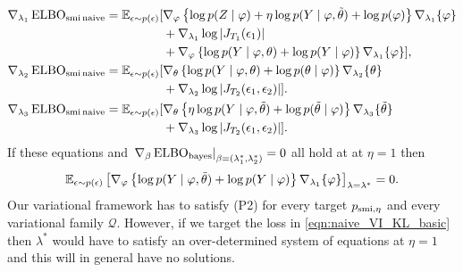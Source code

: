 \begin{align}
  \nabla_{\lambda_1} \operatorname{\text{ELBO}}_{\operatorname{\text{smi}} \text{naive}} = \operatorname{\mathbb{E}}_{\epsilon \sim p(\epsilon)}[ & \nabla_{\varphi} \left\{ \log p(Z \mid \varphi) + \eta \log p(Y \mid \varphi, \tilde\theta) + \log p(\varphi) \right\} \nabla_{\lambda_1} \{ \varphi \} \nonumber                         \\
                                                                                 & + \nabla_{\lambda_1} \log \left\vert J_{T_1}(\epsilon_1) \right\vert \nonumber                                                                                                            \\
                                                                                 & + \nabla_{\varphi} \left\{ \log p(Y \mid \varphi, \theta) + \log p(Y\mid \varphi) \right\} \nabla_{\lambda_1} \{ \varphi \} ]  \label{eq:grad_elbo_l1_naive_smi},                         \\
  \nabla_{\lambda_2} \operatorname{\text{ELBO}}_{\operatorname{\text{smi}} \text{naive}} = \operatorname{\mathbb{E}}_{\epsilon \sim p(\epsilon)}[ & \nabla_{\theta} \left\{ \log p(Y \mid \varphi, \theta) + \log p(\theta \mid \varphi) \right\} \nabla_{\lambda_2} \{ \theta \}                            \nonumber                        \\
                                                                                 & + \nabla_{\lambda_2} \log \left\vert J_{T_2}(\epsilon_1,\epsilon_2) \right\vert  ]. \label{eq:grad_elbo_l2_naive_smi}                                                                     \\
  \nabla_{\lambda_3} \operatorname{\text{ELBO}}_{\operatorname{\text{smi}} \text{naive}} = \operatorname{\mathbb{E}}_{\epsilon \sim p(\epsilon)}[ & \nabla_{\theta} \left\{ \eta \log p(Y \mid \varphi, \tilde\theta) + \log p(\tilde\theta \mid \varphi) \right\} \nabla_{\lambda_3} \{ \tilde\theta \}                            \nonumber \\
                                                                                 & + \nabla_{\lambda_3} \log \left\vert J_{T_2}(\epsilon_1,\epsilon_2) \right\vert  ]. \label{eq:grad_elbo_l3_naive_smi}
\end{align}
If these equations and $\left.\nabla_\beta \operatorname{\text{ELBO}}_{\operatorname{\text{bayes}}}\right\vert_{\beta=(\lambda^*_1,\lambda^*_2)}=0$
all hold at at $\eta=1$ then
\[
  \operatorname{\mathbb{E}}_{\epsilon \sim p(\epsilon)}\left[\nabla_{\varphi} \left\{ \log p(Y \mid \varphi, \tilde\theta) + \log p(Y\mid \varphi) \right\} \nabla_{\lambda_1} \{ \varphi \}\right]_{\lambda=\lambda^*}=0.
\]
Our variational framework has to satisfy (P2) for every target $p_{\operatorname{\text{smi}},\eta}$ and every variational family $\mathcal{Q}$. However, if we target the loss in \cref{eqn:naive_VI_KL_basic} then $\lambda^*$ would have to satisfy an over-determined system of equations at $\eta=1$ and this will in general have no solutions.

